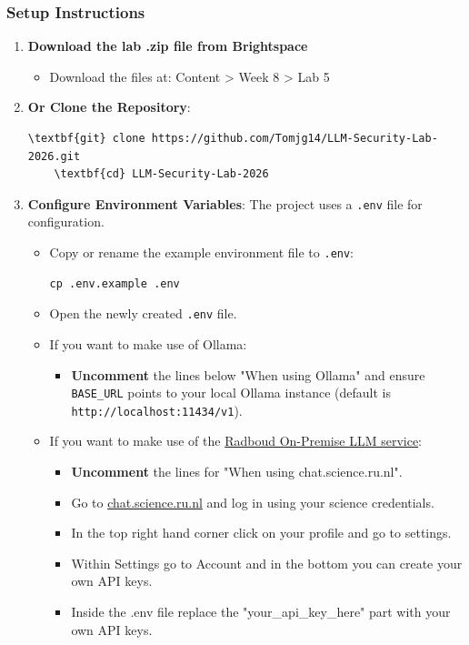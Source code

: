\documentclass{article}
\begin{document}
\subsubsection*{Setup Instructions}
\begin{enumerate}[label=\arabic*.]
    \item \textbf{Download the lab .zip file from Brightspace}
    \begin{itemize}
        \item Download the files at: Content > Week 8 > Lab 5
    \end{itemize}
    \item \textbf{Or Clone the Repository}:
\begin{Verbatim}[commandchars=\\\{\}]
    \textbf{git} clone https://github.com/Tomjg14/LLM-Security-Lab-2026.git
    \textbf{cd} LLM-Security-Lab-2026
\end{Verbatim}

    \item \textbf{Configure Environment Variables}:
    The project uses a \texttt{.env} file for configuration.
    \begin{itemize}
        \item Copy or rename the example environment file to \texttt{.env}:
\begin{Verbatim}[commandchars=\\\{\}]
cp .env.example .env
\end{Verbatim}
        \item Open the newly created \texttt{.env} file.
        \item If you want to make use of Ollama:
        \begin{itemize}
            \item \textbf{Uncomment} the lines below "When using Ollama" and ensure \texttt{BASE\_URL} points to your local Ollama instance (default is \texttt{http://localhost:11434/v1}).
        \end{itemize}
        \item If you want to make use of the \href{https://cncz.science.ru.nl/en/news/2026-02-05_local_llm_chat/}{Radboud On-Premise LLM service}:
        \begin{itemize}
            \item \textbf{Uncomment} the lines for "When using chat.science.ru.nl".
            \item Go to \href{https://chat.science.ru.nl/}{\url{chat.science.ru.nl}} and log in using your science credentials.
            \item In the top right hand corner click on your profile and go to settings.
            \item Within Settings go to Account and in the bottom you can create your own API keys.
            \item Inside the .env file replace the "your\_api\_key\_here" part with your own API keys.
        \end{itemize}
    \end{itemize}
    

\end{enumerate}
\end{document}
